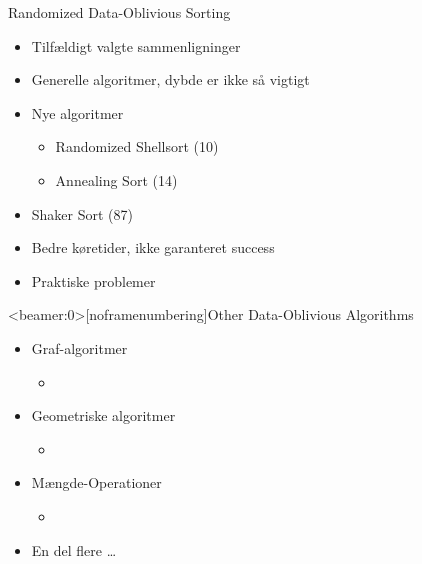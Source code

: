 \begin{frame}{Randomized Data-Oblivious Sorting}
	\begin{itemize}
		\item Tilfældigt valgte sammenligninger
		\item Generelle algoritmer, dybde er ikke så vigtigt
		\item Nye algoritmer
			\begin{itemize}
				\item Randomized Shellsort (10)
				\item Annealing Sort (14)
			\end{itemize}
		\item Shaker Sort (87)
		\item Bedre køretider, ikke garanteret success
		\item Praktiske problemer
	\end{itemize}
\end{frame}


\begin{frame}<beamer:0>[noframenumbering]{Other Data-Oblivious Algorithms}
	\begin{itemize}
		\item Graf-algoritmer
		\begin{itemize}
			\item[] 
		\end{itemize}
		\item Geometriske algoritmer
		\begin{itemize}
			\item[] 
		\end{itemize}
		\item Mængde-Operationer
		\begin{itemize}
			\item[] 
		\end{itemize}
		\item En del flere \dots
	\end{itemize}
\end{frame}
